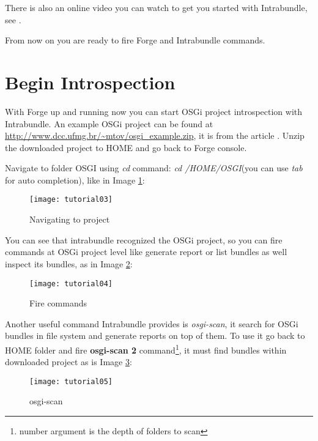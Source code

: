 \begin{appendices}
There is also an online video you can watch to get you started with Intrabundle, see \citep{intrabundle github 2014}.

From now on you are ready to fire Forge and Intrabundle commands. 

\section{Begin Introspection}
With Forge up and running now you can start OSGi project introspection with Intrabundle. An example OSGi project can be found at \\
 \href{http://www.dcc.ufmg.br/\textasciitilde{}mtov/osgi\_example.zip}{http://www.dcc.ufmg.br/\textasciitilde{}mtov/osgi\_example.zip}, it is from the article \citep{Tavares 2008}.
Unzip the downloaded project to HOME and go back to Forge console.

Navigate to folder OSGI using \emph{cd} command: \emph{cd /HOME/OSGI}(you can use \emph{tab} for auto completion), like in Image \ref{navigate project}:

\begin{figure}[h]
\caption{Navigating to project}
\label{navigate project}
\centering
\texttt{[image: tutorial03]}
\end{figure}
\FloatBarrier
 
You can see that intrabundle recognized the OSGi project, so you can fire commands at OSGi project level like generate report or list bundles as well inspect its bundles, as in Image \ref{fire commands}:

\begin{figure}[h]
\caption{Fire commands}
\label{fire commands}
\centering
\texttt{[image: tutorial04]}
\end{figure}
\FloatBarrier

Another useful command Intrabundle provides is \emph{osgi-scan}, it search for OSGi bundles in file system and generate reports on top of them. To use it go back to HOME folder and fire \textbf{osgi-scan 2} command\footnote{number argument is the depth of folders to scan}, it must find bundles within downloaded project as is Image \ref{osgi-scan}:

\begin{figure}[h]
\caption{osgi-scan}
\label{osgi-scan}
\centering
\texttt{[image: tutorial05]}
\end{figure}
\FloatBarrier
\end{appendices}
